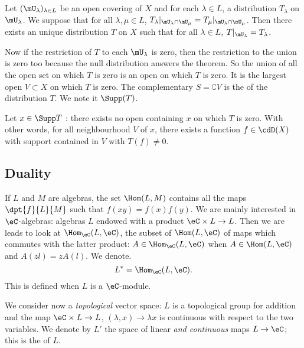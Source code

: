 \begin{theorem}
Let $(\mU_{\lambda})_{\lambda\in L}$ be an open covering of $X$ and for each $\lambda\in L$, a distribution $T_{\lambda}$ on $\mU_{\lambda}$. We suppose that for all $\lambda,\mu\in L$, $T_{\lambda}|_{\mU_{\lambda}\cap\mU_{\mu}}=T_{\mu}|_{\mU_{\lambda}\cap\mU_{\mu}}$. Then there exists an unique distribution $T$ on $X$ such that for all $\lambda\in L$, $T|_{\mU_{\lambda}}=T_{\lambda}$.
\end{theorem}

Now if the restriction  of $T$ to each $\mU_{\lambda}$ is zero, then the restriction to the union is zero too because the null distribution answers the theorem. So the union of all the open set on which $T$ is zero is an open on which $T$ is zero. It is the largest open $V\subset X$ on which $T$ is zero. The complementary $S=\complement V$ is the  of the distribution $T$. We note it $\Supp(T)$.

Let $x\in\Supp T$ : there exists no open containing $x$ on which $T$ is zero. With other words, for all  neighbourhood $V$ of $x$, there exists a function $f\in\cdD(X)$ with support contained in $V$ with $T(f)\neq 0$. 

\subsection{Duality}

If $L$ and $M$ are algebras, the set $\Hom(L,M)$ contains all the maps $\dpt{f}{L}{M}$ such that $f(xy)=f(x)f(y)$. We are mainly interested in $\eC$-algebras: algebras $L$ endowed with a product $\eC\times L\to L$. Then we are leads to look at $\Hom_{\eC}(L,\eC)$, the subset of $\Hom(L,\eC)$ of maps which commutes with the latter product: $A\in\Hom_{\eC}(L,\eC)$ when $A\in\Hom(L,\eC)$ and $A(zl)=zA(l)$. We denote.
\begin{equation}
  L^*=\Hom_{\eC}(L,\eC).
\end{equation}
This is defined when $L$ is a $\eC$-module.

We consider now a \emph{topological} vector space: $L$ is a topological group for addition and the map $\eC\times L\to L$, $(\lambda,x)\to \lambda x$ is continuous with respect to the two variables. We denote by $L'$ the space of linear \emph{and continuous} maps $L\to \eC$; this is the  of $L$.

